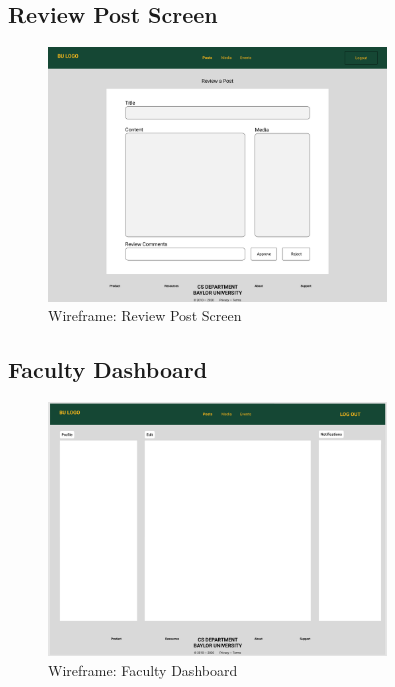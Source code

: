 \documentclass{article}
\begin{document}
\subsection{Review Post Screen}
\begin{figure}[H]
    \centering
    \includegraphics[width=0.8\textwidth]{images/wireframe_reviewPost.png}
    \centering
    \caption{Wireframe: Review Post Screen}
\end{figure}

\subsection{Faculty Dashboard}
\begin{figure}[H]
    \centering
    \includegraphics[width=0.8\textwidth]{images/wireframe_FacultyDashboard.png}
    \centering
    \caption{Wireframe: Faculty Dashboard}
\end{figure}
\end{document}

